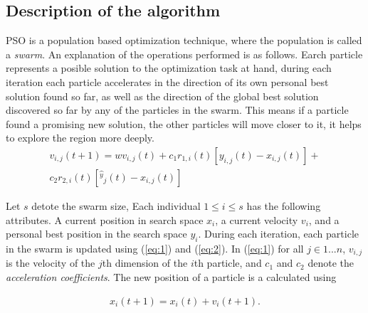 \documentclass[journal]{IEEEtran}
\begin{document}
\subsection{Description of the algorithm}
PSO is a population based optimization technique, where the population is called a \textit{swarm}. An explanation of the operations performed is as follows. Earch particle represents a posible solution to the optimization task at hand, during each iteration each particle accelerates in the direction of its own personal best solution found so far, as well as the direction of the global best solution discovered so far by any of the particles in the swarm. This means if a particle found a promising new solution, the other particles will move closer to it, it helps to explore the region more deeply.
\\
\begin{equation} \label{eq:1}
    \begin{aligned}
    v_{i,j}(t+1)=wv_{i,j}(t)+c_1r_{1,i}(t)[y_{i,j}(t)-x_{i,j}(t)]+\\c_2r_{2,i}(t)[\hat{^y}_j(t)-x_{i,j}(t)]
    \end{aligned}
\end{equation}

Let $s$ detote the swarm size, Each individual $1 \leq i \leq s$ has the following attributes. A current position in search space $x_i$, a current velocity $v_i$, and a personal best position in the search space $y_i$. During each iteration, each particle in the swarm is updated using (\ref{eq:1}) and (\ref{eq:2}). In (\ref{eq:1}) for all $j\in1...n$, $v_{i,j}$ is the velocity of the $j$th dimension of the $i$th particle, and $c_1$ and $c_2$ denote the \textit{acceleration coefficients}. The new position of a particle is a calculated using

\begin{equation} \label{eq:2}
    \begin{aligned}
        x_i(t+1)=x_i(t)+v_i(t+1).
    \end{aligned}
\end{equation}
\end{document}

